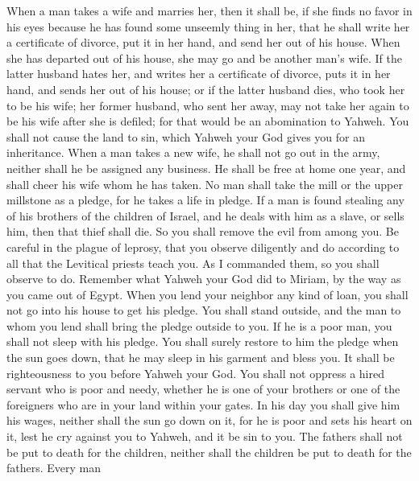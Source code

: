  When a man takes a wife and marries her, then it shall
be, if she finds no favor in his eyes because he has found some unseemly
thing in her, that he shall write her a certificate of divorce, put it
in her hand, and send her out of his house.  When she has
departed out of his house, she may go and be another man's wife.
 If the latter husband hates her, and writes her a
certificate of divorce, puts it in her hand, and sends her out of his
house; or if the latter husband dies, who took her to be his wife;
 her former husband, who sent her away, may not take her
again to be his wife after she is defiled; for that would be an
abomination to Yahweh. You shall not cause the land to sin, which Yahweh
your God gives you for an inheritance.  When a man takes a
new wife, he shall not go out in the army, neither shall he be assigned
any business. He shall be free at home one year, and shall cheer his
wife whom he has taken.  No man shall take the mill or the
upper millstone as a pledge, for he takes a life in pledge.
 If a man is found stealing any of his brothers of the
children of Israel, and he deals with him as a slave, or sells him, then
that thief shall die. So you shall remove the evil from among you.
 Be careful in the plague of leprosy, that you observe
diligently and do according to all that the Levitical priests teach you.
As I commanded them, so you shall observe to do.  Remember
what Yahweh your God did to Miriam, by the way as you came out of Egypt.
 When you lend your neighbor any kind of loan, you shall
not go into his house to get his pledge.  You shall stand
outside, and the man to whom you lend shall bring the pledge outside to
you.  If he is a poor man, you shall not sleep with his
pledge.  You shall surely restore to him the pledge when
the sun goes down, that he may sleep in his garment and bless you. It
shall be righteousness to you before Yahweh your God. 
You shall not oppress a hired servant who is poor and needy, whether he
is one of your brothers or one of the foreigners who are in your land
within your gates.  In his day you shall give him his
wages, neither shall the sun go down on it, for he is poor and sets his
heart on it, lest he cry against you to Yahweh, and it be sin to you.
 The fathers shall not be put to death for the children,
neither shall the children be put to death for the fathers. Every man
